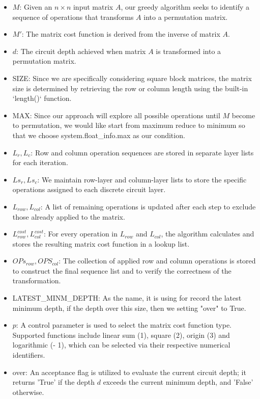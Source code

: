 \begin{itemize}
    \item $M$: Given an $n \times n$ input matrix $A$, our greedy algorithm seeks to identify a sequence of operations that transforms $A$ into a permutation matrix.
    \item $M'$: The matrix cost function is derived from the inverse of matrix $A$.
    \item $d$: The circuit depth achieved when matrix $A$ is transformed into a permutation matrix.
    \item SIZE: Since we are specifically considering square block matrices, the matrix size is determined by retrieving the row or column length using the built-in `length()` function.
    \item MAX: Since our approach will explore all possible operations until $M$ become to permutation, we would like start from maximum reduce to minimum so that we choose system.float\_info.max as our condition.
    \item $L_{r}, L_{c}$: Row and column operation sequences are stored in separate layer lists for each iteration.
    \item $Ls_{r}, Ls_{c}$: We maintain row-layer and column-layer lists to store the specific operations assigned to each discrete circuit layer.
    \item $L_{row}, L_{col}$: A list of remaining operations is updated after each step to exclude those already applied to the matrix.
    \item $L_{row}^{cost}, L_{col}^{cost}$: For every operation in $L_{row}$ and $L_{col}$, the algorithm calculates and stores the resulting matrix cost function in a lookup list.
    \item $OPs_{row}, OPS_{col}$: The collection of applied row and column operations is stored to construct the final sequence list and to verify the correctness of the transformation.
    \item LATEST\_MINM\_DEPTH: As the name, it is using for record the latest minimum depth, if the depth over this size, then we setting "over" to True.
    \item $p$: A control parameter is used to select the matrix cost function type. Supported functions include linear sum (1), square (2), origin (3) and logarithmic (- 1), which can be selected via their respective numerical identifiers.
    \item over: An acceptance flag is utilized to evaluate the current circuit depth; it returns 'True' if the depth $d$ exceeds the current minimum depth, and 'False' otherwise.

\end{itemize}
